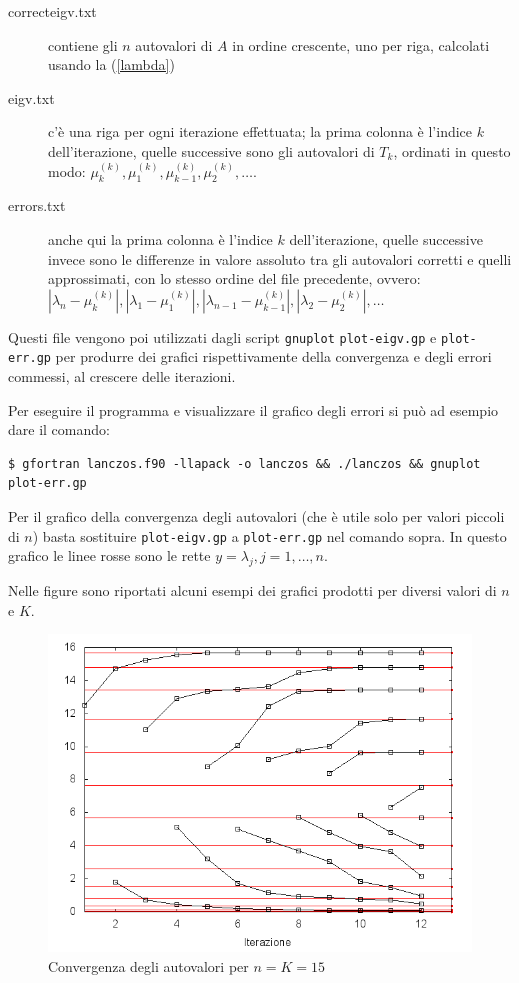 \documentclass[11pt]{article}
\numberwithin{equation}{subsection}
\begin{document}
\begin{description}
\item[correcteigv.txt] contiene gli $n$ autovalori di $A$ in ordine crescente, uno per riga, calcolati usando la (\ref{lambda})
\item[eigv.txt] c'è una riga per ogni iterazione effettuata; la prima colonna è l'indice $k$ dell'iterazione, quelle successive sono gli autovalori di $T_k$, ordinati in questo modo: $\mu_k^{(k)}, \mu_1^{(k)}, \mu_{k-1}^{(k)}, \mu_2^{(k)}, \ldots$.
\item[errors.txt] anche qui la prima colonna è l'indice $k$ dell'iterazione, quelle successive invece sono le differenze in valore assoluto tra gli autovalori corretti e quelli approssimati, con lo stesso ordine del file precedente, ovvero: $|\lambda_n - \mu_k^{(k)}|, |\lambda_1 - \mu_1^{(k)}|, |\lambda_{n-1} - \mu_{k-1}^{(k)}|, |\lambda_2 - \mu_2^{(k)}|, \ldots$
\end{description}

Questi file vengono poi utilizzati dagli script \verb~gnuplot~ \verb~plot-eigv.gp~ e \verb~plot-err.gp~ per produrre dei grafici rispettivamente della convergenza e degli errori commessi, al crescere delle iterazioni. 

Per eseguire il programma e visualizzare il grafico degli errori si può ad esempio dare il comando:
\begin{verbatim}
$ gfortran lanczos.f90 -llapack -o lanczos && ./lanczos && gnuplot plot-err.gp
\end{verbatim}

Per il grafico della convergenza degli autovalori (che è utile solo per valori piccoli di $n$) basta sostituire \verb~plot-eigv.gp~ a \verb~plot-err.gp~ nel comando sopra. In questo grafico le linee rosse sono le rette $y = \lambda_j, j=1, \ldots, n$.

Nelle figure sono riportati alcuni esempi dei grafici prodotti per diversi valori di $n$ e $K$.

\begin{figure}[htb]
\centering
\includegraphics[scale=0.65]{img/eigv_n15K15.png}
\caption{Convergenza degli autovalori per $n = K = 15$}
\end{figure}
\end{document}
